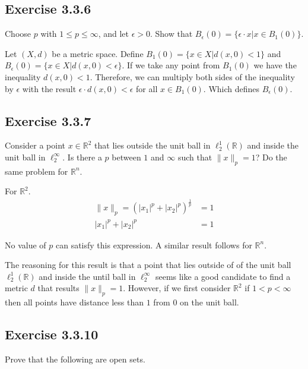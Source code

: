 \documentclass{tufte-book}
\theoremstyle{mytheoremstyle}
\theoremstyle{mylemstyle}
\theoremstyle{mydefstyle}
\begin{document}
\subsection{Exercise 3.3.6}
Choose $p$ with $1 \leq p \leq \infty$, and let $\epsilon >0$.  Show that $B_\epsilon(0) = \{\epsilon \cdot x | x \in B_1(0)\}$. 

Let $(X,d)$ be a metric space.  Define $B_1(0)=\{x \in X | d(x, 0) < 1 \}$ and $B_\epsilon(0)=\{x \in X | d(x, 0) < \epsilon \}$.  If we take any point from $B_1(0)$ we have the inequality $d(x,0) < 1$.  Therefore, we can multiply both sides of the inequality by $\epsilon$ with the result $\epsilon \cdot d(x, 0) < \epsilon$ for all $x \in B_1(0)$.  Which defines $B_\epsilon(0)$.

\subsection{Exercise 3.3.7}
Consider a point $x \in \mathbb{R}^2$ that lies outside the unit ball in $\ell_2^1(\mathbb{R})$ and inside the unit ball in $\ell_2^\infty$.  Is there a $p$ between $1$ and $\infty$ such that $\|x\|_p=1$?  Do the same problem for $\mathbb{R}^n$.

For $\mathbb{R}^2$.
\begin{align*}
\|x\|_p = (|x_1|^p + |x_2|^p)^{\frac{1}{p}} &= 1 \\
|x_1|^p + |x_2|^p &= 1
\end{align*}

No value of $p$ can satisfy this expression.  A similar result follows for $\mathbb{R}^n$.

The reasoning for this result is that a point that lies outside of of the unit ball $\ell_2^1(\mathbb{R})$ and inside the until ball in $\ell_2^\infty$ seems like a good candidate to find a metric $d$ that results $\|x\|_p=1$.  However, if we first consider $\mathbb{R}^2$  if $1<p< \infty$ then all points have distance less than $1$ from $0$ on the unit ball. 

\subsection{Exercise 3.3.10}
Prove that the following are open sets.
\end{document}
